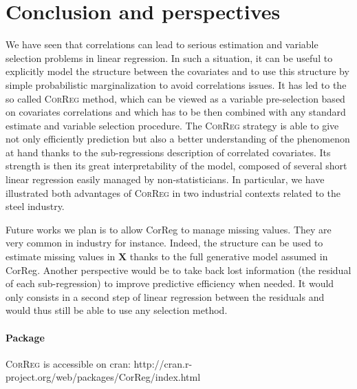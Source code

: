 \documentclass[11pt,a4paper]{article}
\begin{document}
\section{Conclusion and perspectives} \label{conclusion}
	We have seen that correlations can lead to serious estimation and variable selection problems in linear regression. In such a situation, it can be useful to explicitly model the structure between the covariates and to use this structure by simple probabilistic marginalization to avoid correlations issues. It has led to the so called \textsc{CorReg} method, which can be viewed as a variable pre-selection based on covariates correlations and which has to be then combined with any standard estimate and variable selection procedure. The \textsc{CorReg} strategy is able to give not only efficiently prediction but also a better understanding of the phenomenon at hand thanks to the sub-regressions description of correlated covariates. Its strength is then its great interpretability of the model, composed of several short linear regression easily managed by non-statisticians. In particular, we have illustrated both advantages of \textsc{CorReg} in two industrial contexts related to the steel industry.
	

Future works we plan is to allow {\sc CorReg} to manage missing values. They are very common in industry for instance. Indeed, the structure can be used to estimate missing values in $\boldsymbol{X}$ thanks to the full generative model assumed in {\sc CorReg}. Another perspective would be to take back lost information (the residual of each sub-regression) to improve predictive efficiency when needed. It would only consists in a second step of linear regression between the residuals and would thus still be able to use any selection method.

\paragraph{Package} \textsc{CorReg} is accessible on {\sc cran}: http://cran.r-project.org/web/packages/CorReg/index.html
\end{document}
